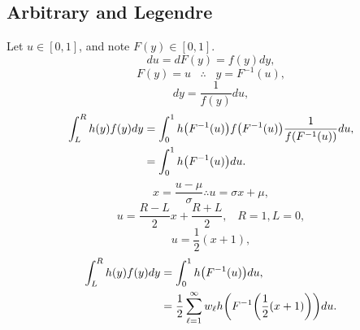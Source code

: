 \documentclass[11pt]{article}
\begin{document}
\subsection{Arbitrary and Legendre}
Let $u\in[0,1]$, and note $F(y)\in[0,1]$.
\begin{equation}
du = dF(y) = f(y)dy,
\end{equation}
\begin{equation}
F(y)=u\hspace{10pt}\therefore\hspace{10pt}y=F^{-1}(u),
\end{equation}
\begin{equation}
dy = \frac{1}{f(y)}du,
\end{equation}
\begin{align}
\int_L^R h(y)f(y)dy &= \int_0^1 h\qty(F^{-1}(u))f\qty(F^{-1}(u))\frac{1}{f\qty(F^{-1}(u))}du,\\
  &=\int_0^1 h\qty(F^{-1}(u))du.
\end{align}
\begin{equation}
x = \frac{u-\mu}{\sigma}\therefore u=\sigma x+\mu,
\end{equation}
\begin{equation}
u = \frac{R-L}{2}x+\frac{R+L}{2},\hspace{10pt}R=1,L=0,
\end{equation}
\begin{equation}
u = \frac{1}{2}(x+1),
\end{equation}
\begin{align}
\int_L^R h(y)f(y)dy&= \int_0^1 h\qty(F^{-1}(u))du,\\
  &=\frac{1}{2}\sum_{\ell=1}^\infty w_\ell h\qty(F^{-1}\qty(\frac{1}{2}(x+1)))du.
\end{align}
\end{document}
